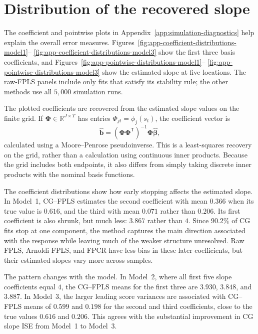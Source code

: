 \section{Distribution of the recovered slope}
\label{sec:results-slope-distributions}

The coefficient and pointwise plots in
Appendix~\ref{app:simulation-diagnostics} help explain the overall error
measures.  Figures~\ref{fig:app-coefficient-distributions-model1}--
\ref{fig:app-coefficient-distributions-model3} show the first three basis
coefficients, and Figures~\ref{fig:app-pointwise-distributions-model1}--
\ref{fig:app-pointwise-distributions-model3} show the estimated slope at
five locations.  The raw-FPLS panels include only fits that satisfy its
stability rule; the other methods use all $5{,}000$ simulation runs.

The plotted coefficients are recovered from the estimated slope values on
the finite grid.  If $\boldsymbol\Phi\in\mathbb{R}^{J\times T}$ has entries
$\Phi_{jt}=\phi_j(s_t)$, the coefficient vector is
\begin{equation}
    \widehat{\boldsymbol b}
    = (\boldsymbol\Phi\boldsymbol\Phi^{\mathsf T})^{-1}
      \boldsymbol\Phi\widehat{\boldsymbol\beta},
    \label{eq:discrete-basis-coefficient-recovery}
\end{equation}
calculated using a Moore--Penrose pseudoinverse.  This is a least-squares
recovery on the grid, rather than a calculation using continuous inner
products.  Because the grid includes both endpoints, it also differs from
simply taking discrete inner products with the nominal basis functions.

The coefficient distributions show how early stopping affects the estimated
slope.  In Model~1, CG--FPLS estimates the second coefficient with mean
$0.366$ when its true value is $0.616$, and the third with mean $0.071$
rather than $0.206$.  Its first coefficient is also shrunk, but much less:
$3.867$ rather than $4$.  Since $90.2\%$ of CG fits stop at one component,
the method captures the main direction associated with the response while
leaving much of the weaker structure unresolved.  Raw FPLS, Arnoldi FPLS,
and FPCR have less bias in these later coefficients, but their estimated
slopes vary more across samples.

The pattern changes with the model.  In Model~2, where all first five slope
coefficients equal $4$, the CG--FPLS means for the first three are $3.930$,
$3.848$, and $3.887$.  In Model~3, the larger leading score variances are
associated with CG--FPLS means of $0.599$ and $0.198$ for the second and
third coefficients, close to the true values $0.616$ and $0.206$.
This agrees with the substantial improvement in CG slope ISE from Model~1
to Model~3.

